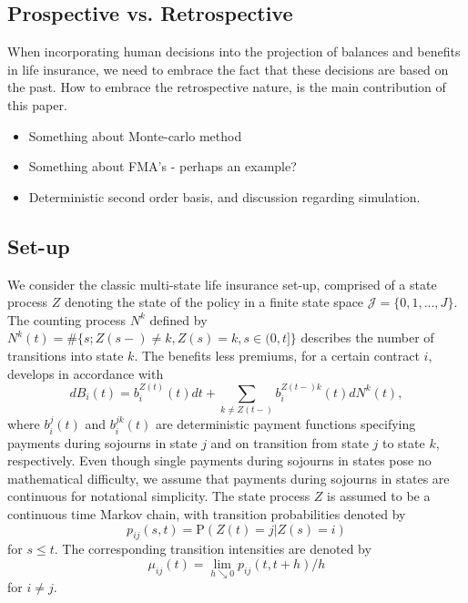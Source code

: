 \documentclass[12pt]{article}
\renewcommand{\P}{\text{P}}
\theoremstyle{my_thm}
\begin{document}
\subsection{Prospective vs. Retrospective}
When incorporating human decisions into the projection of balances and benefits in life insurance, we need to embrace the fact that these decisions are based on the past. How to embrace the retrospective nature, is the main contribution of this paper.\\

\begin{itemize}
\item Something about Monte-carlo method
\item Something about FMA's - perhaps an example?
\item Deterministic second order basis, and discussion regarding simulation.
\end{itemize}

\subsection{Set-up}
We consider the classic multi-state life insurance set-up, comprised of a state process $Z$ denoting the state of the policy in a finite state space $\mathcal{J}=\{0,1,...,J\}$. The counting process $N^k$ defined by $N^k(t)=\# \{ s; Z(s-)\neq k, Z(s)=k, s \in (0,t] \}$ describes the number of transitions into state $k$. The benefits less premiums, for a certain contract $i$, develops in accordance with
$$
dB_i(t)=b_i^{Z(t)}(t) dt +\sum_{k \neq Z(t-)} b_i^{Z(t-)k}(t)dN^k(t),
$$
where $b_i^j(t)$ and $b_i^{jk}(t)$ are deterministic payment functions specifying payments during sojourns in state $j$ and on transition from state $j$ to state $k$, respectively. Even though single payments during sojourns in states pose no mathematical difficulty, we assume that payments during sojourns in states are continuous for notational simplicity. The state process $Z$ is assumed to be a continuous time Markov chain, with transition probabilities denoted by
$$
p_{ij}(s,t)= \P(Z(t)=j|Z(s)=i)
$$
for $s\leq t$. The corresponding transition intensities are denoted by
$$
\mu_{ij}(t)=\lim_{h \searrow 0} p_{ij}(t,t+h)/h
$$
for $i \neq j$. 
\end{document}

